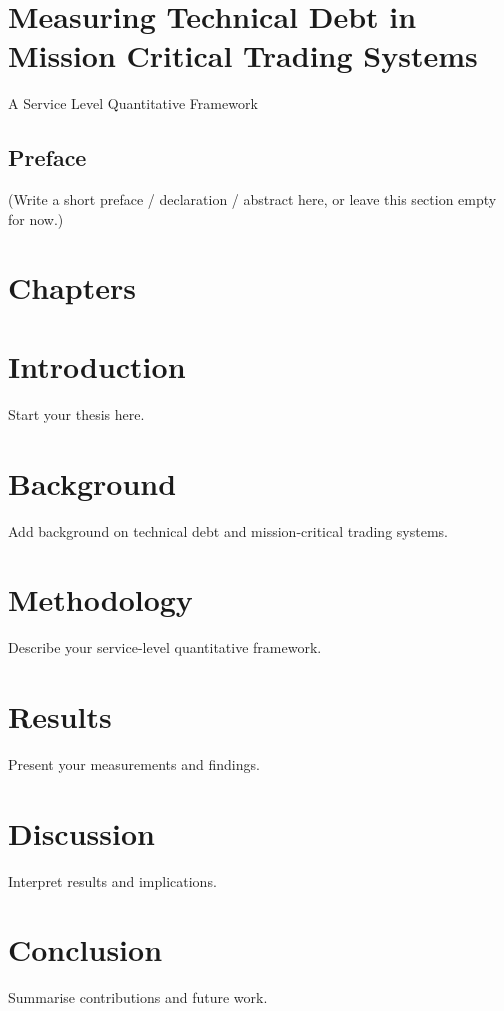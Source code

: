 \documentclass[
  british,
  12pt,
  a4paper,
]{report}
\begin{document}

\chapter{Measuring Technical Debt in Mission Critical Trading
Systems}\label{measuring-technical-debt-in-mission-critical-trading-systems}

A Service Level Quantitative Framework

\hfill\break

\newpage

\section{Preface}\label{preface}

(Write a short preface / declaration / abstract here, or leave this
section empty for now.)


\chapter{Chapters}\label{chapters}


\chapter{Introduction}\label{introduction}

Start your thesis here.


\chapter{Background}\label{background}

Add background on technical debt and mission-critical trading systems.


\chapter{Methodology}\label{methodology}

Describe your service-level quantitative framework.


\chapter{Results}\label{results}

Present your measurements and findings.


\chapter{Discussion}\label{discussion}

Interpret results and implications.


\chapter{Conclusion}\label{conclusion}

Summarise contributions and future work.
\end{document}
